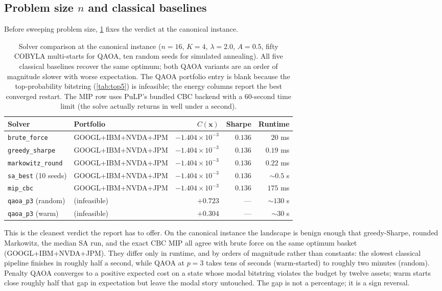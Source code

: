\subsection{Problem size $n$ and classical baselines}\label{subsec:scaling-results}

Before sweeping problem size, \cref{tab:classical-baselines} fixes the verdict at the canonical instance.

\begin{table}[!t]
    \centering
    \small
    \caption{Solver comparison at the canonical instance ($n=16$, $K=4$, $\lambda=2.0$, $A=0.5$, fifty COBYLA multi-starts for QAOA, ten random seeds for simulated annealing). All five classical baselines recover the same optimum; both QAOA variants are an order of magnitude slower with worse expectation. The QAOA portfolio entry is blank because the top-probability bitstring (\cref{tab:top5}) is infeasible; the energy columns report the best converged restart. The MIP row uses PuLP's bundled CBC backend with a $60$-second time limit (the solve actually returns in well under a second).}
    \label{tab:classical-baselines}
    \begin{tabular}{@{}llrrr@{}}
        \toprule
        Solver & Portfolio & $C(\boldsymbol x)$ & Sharpe & Runtime \\
        \midrule
        \texttt{brute\_force}        & GOOGL+IBM+NVDA+JPM & $-1.404\times 10^{-3}$ & $0.136$ & $20$ ms \\
        \texttt{greedy\_sharpe}      & GOOGL+IBM+NVDA+JPM & $-1.404\times 10^{-3}$ & $0.136$ & $0.19$ ms \\
        \texttt{markowitz\_round}    & GOOGL+IBM+NVDA+JPM & $-1.404\times 10^{-3}$ & $0.136$ & $0.22$ ms \\
        \texttt{sa\_best} (10 seeds) & GOOGL+IBM+NVDA+JPM & $-1.404\times 10^{-3}$ & $0.136$ & $\sim 0.5$ s \\
        \texttt{mip\_cbc}            & GOOGL+IBM+NVDA+JPM & $-1.404\times 10^{-3}$ & $0.136$ & $175$ ms \\
        \texttt{qaoa\_p3} (random)   & (infeasible)       & $+0.723$               & ---     & $\sim 130$ s \\
        \texttt{qaoa\_p3} (warm)     & (infeasible)       & $+0.304$               & ---     & $\sim 30$ s \\
        \bottomrule
    \end{tabular}
\end{table}

This is the cleanest verdict the report has to offer. On the canonical instance the landscape is benign enough that greedy-Sharpe, rounded Markowitz, the median SA run, and the exact CBC MIP all agree with brute force on the same optimum basket (GOOGL+IBM+NVDA+JPM). They differ only in runtime, and by orders of magnitude rather than constants: the slowest classical pipeline finishes in roughly half a second, while QAOA at $p=3$ takes tens of seconds (warm-started) to roughly two minutes (random). Penalty QAOA converges to a positive expected cost on a state whose modal bitstring violates the budget by twelve assets; warm starts close roughly half that gap in expectation but leave the modal story untouched. The gap is not a percentage; it is a sign reversal.

